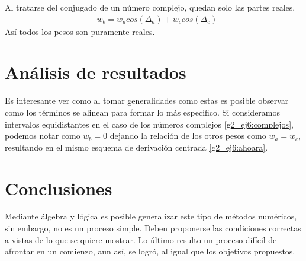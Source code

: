 \documentclass[../portafolio.tex]{subfiles}
\begin{document}
Al tratarse del conjugado de un número complejo, quedan solo las partes reales.
\begin{align}\label{g2_ej6:complejos}
-w_b=w_a cos(\Delta_a) + w_c cos(\Delta_c)
\end{align}
Así todos los pesos son puramente reales.

\section{Análisis de resultados}
Es interesante ver como al tomar generalidades como estas es posible observar como los términos se alinean para formar lo más especifico. Si consideramos intervalos equidistantes en el caso de los números complejos \eqref{g2_ej6:complejos}, podemos notar como $w_b=0$ dejando la relación de los otros pesos como $w_a=w_c$, resultando en el mismo esquema de derivación centrada \eqref{g2_ej6:ahoara}.
\section*{Conclusiones}
Mediante álgebra y lógica es posible generalizar este tipo de métodos numéricos, sin embargo, no es un proceso simple. Deben proponerse las condiciones correctas a vistas de lo que se quiere mostrar. Lo último resulto un proceso difícil de afrontar en un comienzo, aun así, se logró, al igual que los objetivos propuestos.
\end{document}
